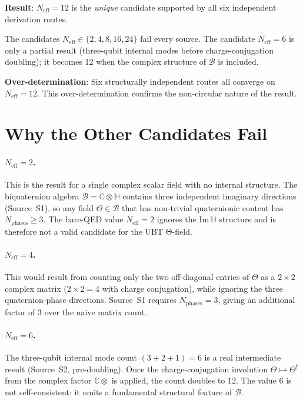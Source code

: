 \documentclass[12pt,a4paper]{article}
\theoremstyle{definition}
\theoremstyle{remark}
\begin{document}
\medskip
\begin{insightbox}
\textbf{Result}: $N_{\mathrm{eff}} = 12$ is the \emph{unique} candidate supported
by all six independent derivation routes.

The candidates $N_{\mathrm{eff}} \in \{2, 4, 8, 16, 24\}$ fail every source.
The candidate $N_{\mathrm{eff}} = 6$ is only a partial result (three-qubit internal
modes before charge-conjugation doubling); it becomes 12 when the complex
structure of $\mathcal{B}$ is included.

\textbf{Over-determination}: Six structurally independent routes all converge on
$N_{\mathrm{eff}} = 12$.  This over-determination confirms the non-circular
nature of the result.
\end{insightbox}

\section{Why the Other Candidates Fail}
\label{sec:rejections}

\paragraph{$N_{\mathrm{eff}} = 2$.}
This is the result for a single complex scalar field with no internal structure.
The biquaternion algebra $\mathcal{B} = \mathbb{C}\otimes\mathbb{H}$ contains
three independent imaginary directions (Source~S1), so any field $\Theta\in\mathcal{B}$
that has non-trivial quaternionic content has $N_{\mathrm{phases}}\geq 3$.
The bare-QED value $N_{\mathrm{eff}} = 2$ ignores the Im$\,\mathbb{H}$ structure
and is therefore not a valid candidate for the UBT Θ-field.

\paragraph{$N_{\mathrm{eff}} = 4$.}
This would result from counting only the two off-diagonal entries of $\Theta$
as a $2\times 2$ complex matrix ($2\times 2 = 4$ with charge conjugation), while
ignoring the three quaternion-phase directions.  Source~S1 requires $N_{\mathrm{phases}}
= 3$, giving an additional factor of 3 over the naive matrix count.

\paragraph{$N_{\mathrm{eff}} = 6$.}
The three-qubit internal mode count $(3+2+1) = 6$ is a real intermediate result
(Source~S2, pre-doubling).  Once the charge-conjugation involution $\Theta\mapsto\Theta^\dagger$
from the complex factor $\mathbb{C}\otimes$ is applied, the count doubles to 12.
The value 6 is not self-consistent: it omits a fundamental structural feature of $\mathcal{B}$.
\end{document}
